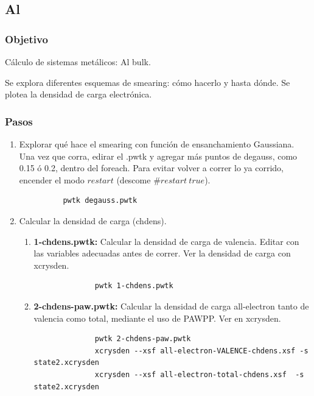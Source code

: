 \subsection{Al}

\subsubsection{Objetivo}

  Cálculo de sistemas metálicos: Al bulk.

  Se explora diferentes esquemas de smearing: cómo hacerlo y hasta dónde. Se plotea la densidad de carga electrónica.

\subsubsection{Pasos}

    \begin{enumerate}
      \item Explorar qué hace el smearing con función de ensanchamiento Gaussiana. Una vez que corra, edirar el .pwtk y agregar más puntos de degauss, como 0.15 ó 0.2, dentro del foreach. Para evitar volver a correr lo ya corrido, encender el modo $restart$ (descome $\#restart\ true$).
        \begin{verbatim}
          pwtk degauss.pwtk
        \end{verbatim}
      \item Calcular la densidad de carga (chdens).
        \begin{enumerate}
          \item \textbf{1-chdens.pwtk:}
            Calcular la densidad de carga de valencia. Editar con las variables adecuadas antes de correr. Ver la densidad de carga con xcrysden.
            \begin{verbatim}
              pwtk 1-chdens.pwtk
            \end{verbatim}
          \item \textbf{2-chdens-paw.pwtk:}
            Calcular la densidad de carga all-electron tanto de valencia como total, mediante el uso de PAWPP. Ver en xcrysden.
            \begin{verbatim}
              pwtk 2-chdens-paw.pwtk
              xcrysden --xsf all-electron-VALENCE-chdens.xsf -s state2.xcrysden
              xcrysden --xsf all-electron-total-chdens.xsf  -s state2.xcrysden
            \end{verbatim}
        \end{enumerate}
    \end{enumerate}

